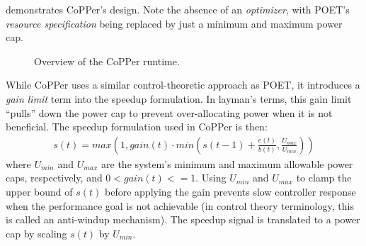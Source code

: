  demonstrates CoPPer's design.
Note the absence of an \emph{optimizer}, with POET's \emph{resource specification} being replaced by just a minimum and maximum power cap.

\begin{figure}[t]
  \begin{centering}
    
    \caption{Overview of the CoPPer runtime.}
    \label{fig:copper-runtime}
  \end{centering}
\end{figure}

While CoPPer uses a similar control-theoretic approach as POET, it introduces a \emph{gain limit} term into the speedup formulation.
In layman's terms, this gain limit ``pulls'' down the power cap to prevent over-allocating power when it is not beneficial.
The speedup formulation used in CoPPer is then:
\begin{eqnarray}
  s(t) = max\left(1, gain(t) \cdot min\left(s(t-1) + \frac{e(t)}{b(t)}, \frac{U_{max}}{U_{min}}\right)\right)
  \label{eqn:copper-speedup-control}
\end{eqnarray}
where $U_{min}$ and $U_{max}$ are the system's minimum and maximum allowable power caps, respectively, and $0 < gain(t) <= 1$.
Using $U_{min}$ and $U_{max}$ to clamp the upper bound of $s(t)$ before applying the gain prevents slow controller response when the performance goal is not achievable (in control theory terminology, this is called an anti-windup mechanism).
The speedup signal is translated to a power cap by scaling $s(t)$ by $U_{min}$.


